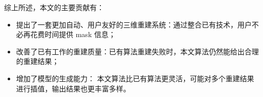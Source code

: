综上所述，本文的主要贡献有：
\begin{itemize}
	\item 提出了一套更加自动、用户友好的三维重建系统：通过整合已有技术，用户不必再花费时间提供 mask 信息；
	\item 改善了已有工作的重建质量：已有算法重建失败时，本文算法仍然能给出合理的重建结果；
	\item 增加了模型的生成能力：%
	      本文算法比已有算法更灵活，可能对多个重建结果进行插值，输出结果也更丰富多样。
\end{itemize}

